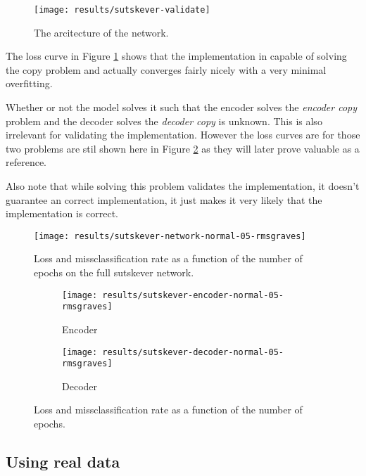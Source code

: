 \begin{figure}[H]
	\centering
	\texttt{[image: results/sutskever-validate]}
	\caption{The arcitecture of the network.}
\end{figure}

The loss curve in Figure \ref{fig:results:sutskever:network-05} shows that the implementation in capable of solving the copy problem and actually converges fairly nicely with a very minimal overfitting.

Whether or not the model solves it such that the encoder solves the \textit{encoder copy} problem and the decoder solves the \textit{decoder copy} is unknown. This is also irrelevant for validating the implementation. However the loss curves are for those two problems are stil shown here in Figure \ref{fig:results:sutskever:decoder-encoder-05} as they will later prove valuable as a reference.

Also note that while solving this problem validates the implementation, it doesn't guarantee an correct implementation, it just makes it very likely that the implementation is correct.

\begin{figure}[h]
	\centering
	\texttt{[image: results/sutskever-network-normal-05-rmsgraves]}
	\caption{Loss and missclassification rate as a function of the number of epochs on the full sutskever network.}
	\label{fig:results:sutskever:network-05}
\end{figure}
\begin{figure}[H]
        \vspace{-0.5cm}
        \centering
        \begin{subfigure}[b]{0.49\textwidth}
                \texttt{[image: results/sutskever-encoder-normal-05-rmsgraves]}
                \caption{Encoder}
        \end{subfigure}
        \begin{subfigure}[b]{0.49\textwidth}
                \texttt{[image: results/sutskever-decoder-normal-05-rmsgraves]}
                \caption{Decoder}
        \end{subfigure}
        \caption{Loss and missclassification rate as a function of the number of epochs.}
        \label{fig:results:sutskever:decoder-encoder-05}
\end{figure}

\subsection{Using real data}

